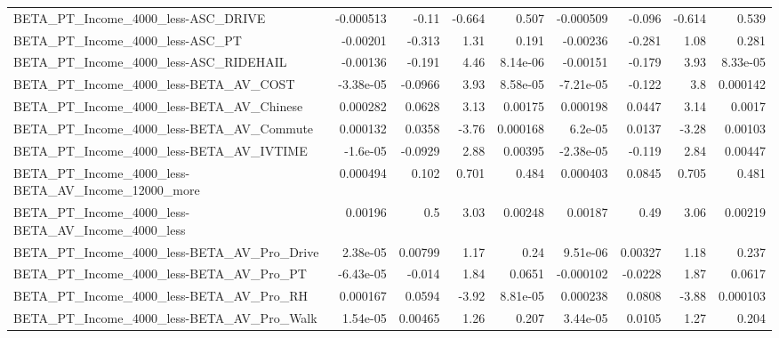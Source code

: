 \begin{tabular}{lrrrrrrrr}
BETA\_PT\_Income\_4000\_less-ASC\_DRIVE                 &   -0.000513 &        -0.11 &    -0.664 &    0.507 &  -0.000509 &      -0.096 &       -0.614 &         0.539 \\
BETA\_PT\_Income\_4000\_less-ASC\_PT                    &    -0.00201 &       -0.313 &      1.31 &    0.191 &   -0.00236 &      -0.281 &         1.08 &         0.281 \\
BETA\_PT\_Income\_4000\_less-ASC\_RIDEHAIL              &    -0.00136 &       -0.191 &      4.46 & 8.14e-06 &   -0.00151 &      -0.179 &         3.93 &      8.33e-05 \\
BETA\_PT\_Income\_4000\_less-BETA\_AV\_COST              &   -3.38e-05 &      -0.0966 &      3.93 & 8.58e-05 &  -7.21e-05 &      -0.122 &          3.8 &      0.000142 \\
BETA\_PT\_Income\_4000\_less-BETA\_AV\_Chinese           &    0.000282 &       0.0628 &      3.13 &  0.00175 &   0.000198 &      0.0447 &         3.14 &        0.0017 \\
BETA\_PT\_Income\_4000\_less-BETA\_AV\_Commute           &    0.000132 &       0.0358 &     -3.76 & 0.000168 &    6.2e-05 &      0.0137 &        -3.28 &       0.00103 \\
BETA\_PT\_Income\_4000\_less-BETA\_AV\_IVTIME            &    -1.6e-05 &      -0.0929 &      2.88 &  0.00395 &  -2.38e-05 &      -0.119 &         2.84 &       0.00447 \\
BETA\_PT\_Income\_4000\_less-BETA\_AV\_Income\_12000\_more &    0.000494 &        0.102 &     0.701 &    0.484 &   0.000403 &      0.0845 &        0.705 &         0.481 \\
BETA\_PT\_Income\_4000\_less-BETA\_AV\_Income\_4000\_less  &     0.00196 &          0.5 &      3.03 &  0.00248 &    0.00187 &        0.49 &         3.06 &       0.00219 \\
BETA\_PT\_Income\_4000\_less-BETA\_AV\_Pro\_Drive         &    2.38e-05 &      0.00799 &      1.17 &     0.24 &   9.51e-06 &     0.00327 &         1.18 &         0.237 \\
BETA\_PT\_Income\_4000\_less-BETA\_AV\_Pro\_PT            &   -6.43e-05 &       -0.014 &      1.84 &   0.0651 &  -0.000102 &     -0.0228 &         1.87 &        0.0617 \\
BETA\_PT\_Income\_4000\_less-BETA\_AV\_Pro\_RH            &    0.000167 &       0.0594 &     -3.92 & 8.81e-05 &   0.000238 &      0.0808 &        -3.88 &      0.000103 \\
BETA\_PT\_Income\_4000\_less-BETA\_AV\_Pro\_Walk          &    1.54e-05 &      0.00465 &      1.26 &    0.207 &   3.44e-05 &      0.0105 &         1.27 &         0.204 \\

\end{tabular}
